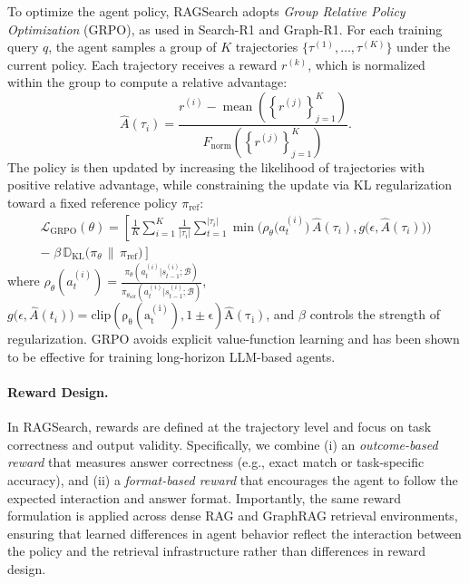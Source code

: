 To optimize the agent policy, RAGSearch adopts \emph{Group Relative Policy Optimization} (GRPO), as used in Search-R1 and Graph-R1. For each training query $q$, the agent samples a group of $K$ trajectories $\{\tau^{(1)}, \dots, \tau^{(K)}\}$ under the current policy. Each trajectory receives a reward $r^{(k)}$, which is normalized within the group to compute a relative advantage:
\[
\hat{A}(\tau_i)
=
\frac{
r^{(i)} - \operatorname{mean}\!\left(\left\{ r^{(j)}\right\}_{j=1}^{K}\right)
}{
F_{\mathrm{norm}}\!\left(\left\{ r^{(j)}\right\}_{j=1}^{K}\right)
}.
\]
The policy is then updated by increasing the likelihood of trajectories with positive relative advantage, while constraining the update via KL regularization toward a fixed reference policy $\pi_{\mathrm{ref}}$:
\begin{equation}
\begin{aligned}
\mathcal{L}_{\mathrm{GRPO}}(\theta) = \left[
\frac{1}{K}\sum_{i=1}^{K}\frac{1}{|\tau_i|}
\sum_{t=1}^{|\tau_i|}
\min\!\Big(
\rho_{\theta}\big(a^{(i)}_{t}\big)\,\hat{A}(\tau_i),g\big(\epsilon, \hat{A}(\tau_i)\big)
\Big)
\right. \\
\left.
-\;\beta\,\mathbb{D}_{\mathrm{KL}}\!\big(\pi_{\theta}\,\|\,\pi_{\mathrm{ref}}\big)
\right]
\end{aligned}
\end{equation}
where $\rho_{\theta}(a^{(i)}_{t}) = \frac{\pi_{\theta}(a_t^{(i)}|s_{t-1}^{(i)};\mathcal{B})}{\pi_{\theta_{old}}(a_t^{(i)}|s_{t-1}^{(i)};\mathcal{B})}$, $g\big(\epsilon, \hat{A}(t_i)\big)=\operatorname{clip(\rho_{\theta}(a^{(i)}_{t}), 1 \pm \epsilon)\hat{A}(\tau_i)}$, and
$\beta$ controls the strength of regularization. GRPO avoids explicit value-function learning and has been shown to be effective for training long-horizon LLM-based agents.

\paragraph{\textbf{Reward Design}.}
In RAGSearch, rewards are defined at the trajectory level and focus on task correctness and output validity. Specifically, we combine (i) an \emph{outcome-based reward} that measures answer correctness (e.g., exact match or task-specific accuracy), and (ii) a \emph{format-based reward} that encourages the agent to follow the expected interaction and answer format. Importantly, the same reward formulation is applied across dense RAG and GraphRAG retrieval environments, ensuring that learned differences in agent behavior reflect the interaction between the policy and the retrieval infrastructure rather than differences in reward design.

